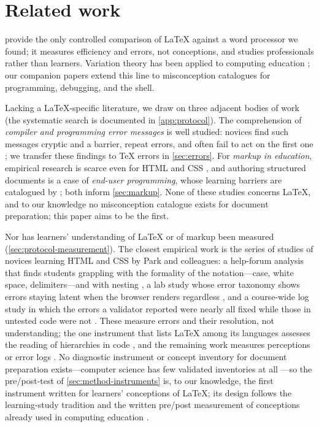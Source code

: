 \mode*
\section{Related work}
\label{sec:related}

\Textcite{Knauff2014Latex} provide the only controlled comparison of LaTeX
against a word processor we found; it measures efficiency and errors, not
conceptions, and studies professionals rather than learners.
Variation theory has been applied to computing education
\autocite{ThuneEckerdal2009Variation,ThuneEckerdal2018Lab,
Svensson2020Affordances}; our companion papers
\autocite{VTProgMisconceptions,VTDebug,VTTerminal} extend this line to
misconception catalogues for programming, debugging, and the shell.

Lacking a LaTeX-specific literature, we draw on three adjacent bodies of
work (the systematic search is documented in \cref{app:protocol}).
The comprehension of \emph{compiler and programming error messages} is
well studied: novices find such messages cryptic and a barrier, repeat
errors, and often fail to act on the first one
\autocite{Becker2016CEM,Traver2010CompilerErrors,%
Munson2016CompilerErrors,Denny2021ErrorReadability,Prather2017Interaction};
we transfer these findings to TeX errors in \cref{sec:errors}.
For \emph{markup in education}, empirical research is scarce even for HTML
and CSS \autocite{Kharchenko2025WebDesign}, and authoring structured
documents is a case of \emph{end-user programming}, whose learning
barriers are catalogued by \textcite{Ko2004Barriers}; both inform
\cref{sec:markup}.
None of these studies concerns LaTeX, and to our knowledge no misconception
catalogue exists for document preparation; this paper aims to be the first.

Nor has learners' understanding of LaTeX or of markup been measured
(\cref{sec:protocol-measurement}).
The closest empirical work is the series of studies of novices learning
HTML and CSS by Park and colleagues: a help-forum analysis that finds
students grappling with the formality of the notation---case, white
space, delimiters---and with nesting \autocite{Park2011WebDev}, a lab study
whose error taxonomy shows errors staying latent when the browser renders
regardless \autocite{Park2013ErrorTaxonomy}, and a course-wide log study in
which the errors a validator reported were nearly all fixed while those
in untested code were not \autocite{Park2015SyntaxErrors}.
These measure errors and their resolution, not understanding; the one
instrument that lists LaTeX among its languages assesses the reading of
hierarchies in code \autocite{Park2016Hierarchies}, and the remaining work
measures perceptions \autocite{Loch2015WordMaths} or error logs
\autocite{Kim2019CSSLayout}.
No diagnostic instrument or concept inventory for document preparation
exists---computer science has few validated inventories at all
\autocite{Taylor2014CI}---so the pre/post-test of
\cref{sec:method-instruments} is, to our knowledge, the first instrument
written for learners' conceptions of LaTeX; its design follows the
learning-study tradition \autocite{PangMarton2005,Kullberg2017ZDM} and the
written pre/post measurement of conceptions already used in computing
education \autocite{Pamplona2024VirtualMemory}.
